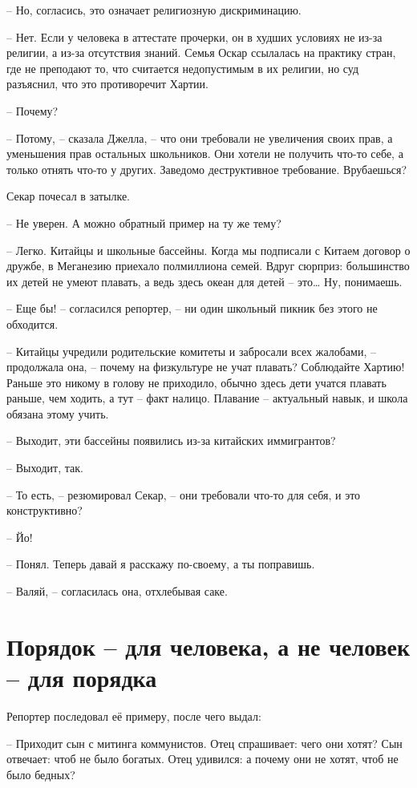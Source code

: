 -- Но, согласись, это означает религиозную дискриминацию.

-- Нет. Если у человека в аттестате прочерки, он в худших условиях не из-за религии, а из-за отсутствия знаний. Семья Оскар ссылалась на практику стран, где не преподают то, что считается недопустимым в их религии, но суд разъяснил, что это противоречит Хартии.

-- Почему?

-- Потому, -- сказала Джелла, -- что они требовали не увеличения своих прав, а уменьшения прав остальных школьников. Они хотели не получить что-то себе, а только отнять что-то у других. Заведомо деструктивное требование. Врубаешься?

Секар почесал в затылке.

-- Не уверен. А можно обратный пример на ту же тему?

-- Легко. Китайцы и школьные бассейны. Когда мы подписали с Китаем договор о дружбе, в Меганезию приехало полмиллиона семей. Вдруг сюрприз: большинство их детей не умеют плавать, а ведь здесь океан для детей -- это\ldots{} Ну, понимаешь.

-- Еще бы! -- согласился репортер, -- ни один школьный пикник без этого не обходится.

-- Китайцы учредили родительские комитеты и забросали всех жалобами, -- продолжала она, -- почему на физкультуре не учат плавать? Соблюдайте Хартию! Раньше это никому в голову не приходило, обычно здесь дети учатся плавать раньше, чем ходить, а тут -- факт налицо. Плавание -- актуальный навык, и школа обязана этому учить.

-- Выходит, эти бассейны появились из-за китайских иммигрантов?

-- Выходит, так.

-- То есть, -- резюмировал Секар, -- они требовали что-то для себя, и это конструктивно?

-- Йо!

-- Понял. Теперь давай я расскажу по-своему, а ты поправишь.

-- Валяй, -- согласилась она, отхлебывая саке.


\chapter{Порядок -- для человека, а не человек -- для порядка}


Репортер последовал её примеру, после чего выдал:

-- Приходит сын с митинга коммунистов. Отец спрашивает: чего они хотят? Сын отвечает: чтоб не было богатых. Отец удивился: а почему они не хотят, чтоб не было бедных?

